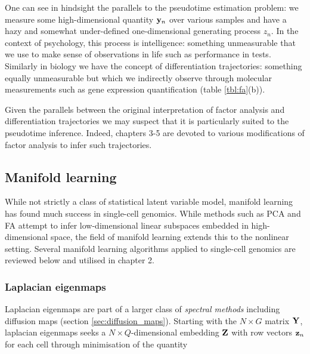 One can see in hindsight the parallels to the pseudotime estimation problem: we measure some high-dimensional quantity $\mathbf{y}_n$ over various samples and have a hazy and somewhat under-defined one-dimensional generating process $z_n$. In the context of psychology, this process is intelligence: something unmeasurable that we use to make sense of observations in life such as performance in tests. Similarly in biology we have the concept of differentiation trajectories: something equally unmeasurable but which we indirectly observe through molecular measurements such as gene expression quantification (table \ref{tbl:fa}(b)).

Given the parallels between the original interpretation of factor analysis and differentiation trajectories we may suspect that it is particularly suited to the pseudotime inference. Indeed, chapters 3-5 are devoted to various modifications of factor analysis to infer such trajectories.




\subsection{Manifold learning} \label{sec:int:manifold}

While not strictly a class of statistical latent variable model, manifold learning has found much success in single-cell genomics. While methods such as PCA and FA attempt to infer low-dimensional linear subspaces embedded in high-dimensional space, the field of manifold learning extends this to the nonlinear setting. Several manifold learning algorithms applied to single-cell genomics are reviewed below and utilised in chapter 2.

\subsubsection{Laplacian eigenmaps}

Laplacian eigenmaps \cite{Belkin2003} are part of a larger class of \emph{spectral methods} including diffusion maps (section \ref{sec:diffusion_maps}). Starting with the $N \times G$ matrix $\mathbf{Y}$, laplacian eigenmaps seeks a $N \times Q$-dimensional embedding $\mathbf{Z}$ with row vectors $\mathbf{z}_n$ for each cell through minimisation of the quantity

